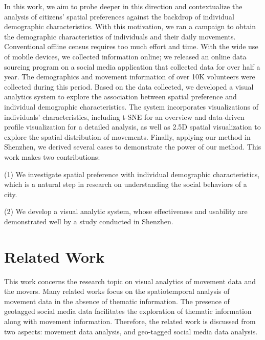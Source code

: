 \documentclass{ieeeaccess}
\begin{document}
In this work, we aim to probe deeper in this direction and contextualize the analysis of citizens' spatial preferences against the backdrop of individual demographic characteristics. With this motivation, we ran a campaign to obtain the demographic characteristics of individuals and their daily movements. Conventional offline census requires too much effort and time. With the wide use of mobile devices, we collected information online; we released an online data sourcing program on a social media application that collected data for over half a year. The demographics and movement information of over 10K volunteers were collected during this period. Based on the data collected, we developed a visual analytics system to explore the association between spatial preference and individual demographic characteristics. The system incorporates visualizations of individuals' characteristics, including t-SNE for an overview and data-driven profile visualization for a detailed analysis, as well as 2.5D spatial visualization to explore the spatial distribution of movements. Finally, applying our method in Shenzhen, we derived several cases to demonstrate the power of our method. This work makes two contributions:

(1) We investigate spatial preference with individual demographic characteristics, which is a natural step in research on understanding the social behaviors of a city.

(2) We develop a visual analytic system, whose effectiveness and usability are demonstrated well by a study conducted in Shenzhen.



\section{Related Work}
This work concerns the research topic on visual analytics of movement data and the movers. Many related works focus on the spatiotemporal analysis of movement data in the absence of thematic information. The presence of geotagged social media data facilitates the exploration of thematic information along with movement information. Therefore, the related work is discussed from two aspects: movement data analysis, and geo-tagged social media data analysis.
\end{document}
